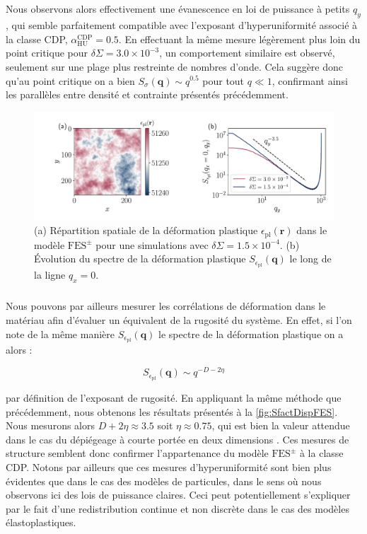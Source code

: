 \subparagraph{}Nous observons alors effectivement une évanescence en loi de puissance à petits $q_y$, qui semble parfaitement compatible avec l'exposant d'hyperuniformité associé à la classe CDP, $\alpha_\text{HU}^\text{CDP} = 0.5$. En effectuant la même mesure légèrement plus loin du point critique pour $\delta\Sigma = 3.0\times 10^{-3}$, un comportement similaire est observé, seulement sur une plage plus restreinte de nombres d'onde. Cela suggère donc qu'au point critique on a bien $S_\sigma(\mathbf{q})\sim q^{0.5}$ pour tout $q\ll 1$, confirmant ainsi les parallèles entre densité et contrainte présentés précédemment.

\begin{figure}[h]
	\centering	\includegraphics[width=\textwidth]{Chapitre4/Figures/Correlations/Sfact_Disp_SRPNC.pdf}
	\caption{(a) Répartition spatiale de la déformation plastique $\epsilon_\text{pl}(\mathbf{r})$ dans le modèle $\text{FES}^\pm$ pour une simulations avec $\delta\Sigma = 1.5\times 10^{-4}$. (b) Évolution du spectre de la déformation plastique $S_{\epsilon_\text{pl}}(\mathbf{q})$ le long de la ligne $q_x=0$.}
	\label{fig:SfactDispFES}
\end{figure}

\subparagraph{}Nous pouvons par ailleurs mesurer les corrélations de déformation dans le matériau afin d'évaluer un équivalent de la rugosité du système. En effet, si l'on note de la même manière $S_{\epsilon_\text{pl}}(\mathbf{q})$ le spectre de la déformation plastique on a alors :

\begin{equation}
	S_{\epsilon_\text{pl}}(\mathbf{q}) \sim q^{-D-2\eta}
\end{equation}

\noindent par définition de l'exposant de rugosité. En appliquant la même méthode que précédemment, nous obtenons les résultats présentés à la \autoref{fig:SfactDispFES}. Nous mesurons alors $D+2\eta \approx 3.5$ soit $\eta\approx 0.75$, qui est bien la valeur attendue dans le cas du dépiégeage à courte portée en deux dimensions \cite{semeikin_roughness_2024}. Ces mesures de structure semblent donc confirmer l'appartenance du modèle $\text{FES}^\pm$ à la classe CDP. Notons par ailleurs que ces mesures d'hyperuniformité sont bien plus évidentes que dans le cas des modèles de particules, dans le sens où nous observons ici des lois de puissance claires. Ceci peut potentiellement s'expliquer par le fait d'une redistribution continue et non discrète dans le cas des modèles élastoplastiques.

